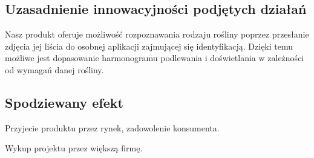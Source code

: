 \documentclass[12pt]{article}
\begin{document}
\subsection{Uzasadnienie innowacyjności podjętych działań }


Nasz produkt oferuje możliwość rozpoznawania rodzaju rośliny poprzez przesłanie zdjęcia jej liścia do osobnej aplikacji zajmującej się identyfikacją. Dzięki temu możliwe jest dopasowanie harmonogramu podlewania i doświetlania w zależności od wymagań danej rośliny.

\subsection{Spodziewany efekt }


Przyjecie produktu przez rynek, zadowolenie konsumenta.
 
Wykup projektu przez większą firmę.
\end{document}
